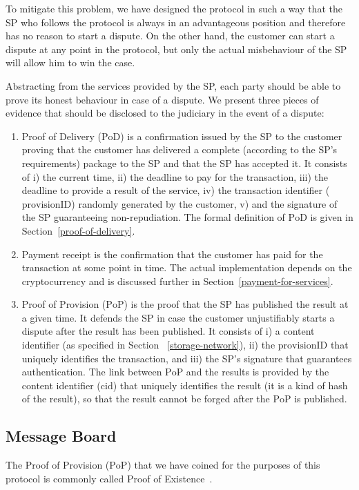 \documentclass[pdftex,twocolumn,epjc3]{svjour3}
\begin{document}
{To mitigate this problem, we have designed the protocol in such a way that the SP who follows the protocol is always in an advantageous position and therefore has no reason to start a dispute. On the other hand, the customer can start a dispute at any point in the protocol, but only the actual misbehaviour of the SP will allow him to win the case.

Abstracting from the services provided by the SP, each party should be able to prove its honest behaviour in case of a dispute. We present three pieces of evidence that should be disclosed to the judiciary in the event of a dispute:

\begin{enumerate}
    \item Proof of Delivery ($\mathrm{PoD}$) is a confirmation issued by the SP to the customer proving that the customer has delivered a complete (according to the SP's requirements) package to the SP and that the SP has accepted it. It consists of i) the current time, ii) the deadline to pay for the transaction, iii) the deadline to provide a result of the service, iv) the transaction identifier ($\textrm{provisionID}$) randomly generated by the customer, v) and the signature of the SP guaranteeing non-repudiation. The formal definition of $\mathrm{PoD}$ is given in Section~\ref{proof-of-delivery}.
    
    \item Payment $\mathrm{receipt}$ is the confirmation that the customer has paid for the transaction at some point in time. The actual implementation depends on the cryptocurrency and is discussed further in Section~\ref{payment-for-services}.
    
    \item Proof of Provision ($\mathrm{PoP}$) is the proof that the SP has published the result at a given time. It defends the SP in case the customer unjustifiably starts a dispute after the result has been published. It consists of i) a content identifier (as specified in Section ~\ref{storage-network}), ii) the $\textrm{provisionID}$ that uniquely identifies the transaction, and iii) the SP's signature that guarantees authentication. The link between $\mathrm{PoP}$ and the results is provided by the content identifier ($\mathrm{cid}$) that uniquely identifies the result (it is a kind of hash of the result), so that the result cannot be forged after the $\mathrm{PoP}$ is published.
\end{enumerate}

\subsection{Message Board}\label{sec:message-board}
The Proof of Provision ($\mathrm{PoP}$) that we have coined for the purposes of this protocol is commonly called Proof of Existence~\cite{crespoStamperyBlockchainTimestamping2017}.

}
\end{document}
